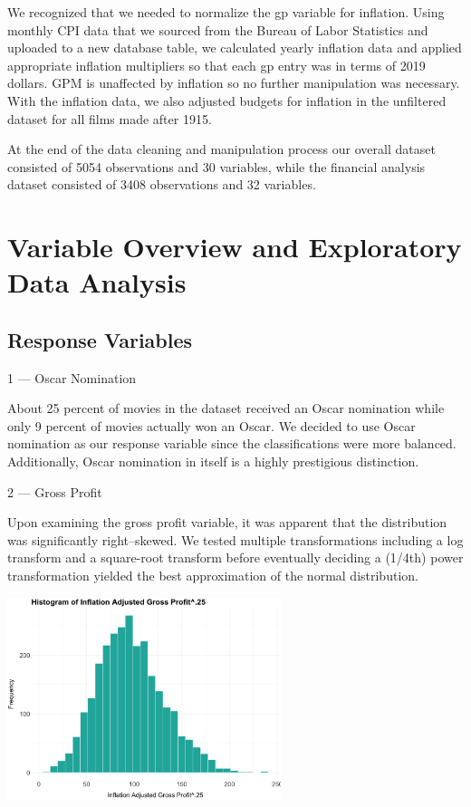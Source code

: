 \documentclass[10pt]{article}
\begin{document}
We recognized that we needed to normalize the gp variable for inflation. Using monthly CPI data that we sourced from the Bureau of Labor Statistics and uploaded to a new database table, we calculated yearly inflation data and applied appropriate inflation multipliers so that each gp entry was in terms of 2019 dollars. GPM is unaffected by inflation so no further manipulation was necessary. With the inflation data, we also adjusted budgets for inflation in the unfiltered dataset for all films made after 1915.

At the end of the data cleaning and manipulation process our overall dataset consisted of 5054 observations and 30 variables, while the financial analysis dataset consisted of 3408 observations and 32 variables.


\section{Variable Overview and Exploratory Data Analysis}

\subsection{Response Variables}

1 --- Oscar Nomination

About 25 percent of movies in the dataset received an Oscar nomination while only 9 percent of movies actually won an Oscar. We decided to use Oscar nomination as our response variable since the classifications were more balanced. Additionally, Oscar nomination in itself is a highly prestigious distinction.



2 --- Gross Profit

Upon examining the gross profit variable, it was apparent that the distribution was significantly right–skewed. We tested multiple transformations including a log transform and a square-root transform before eventually deciding a (1/4th) power transformation yielded the best approximation of the normal distribution. 

\begin{center}
\includegraphics[width=8cm]{_assets/_eda/grossprofit_hist_t.png}
\end{center}
\end{document}
